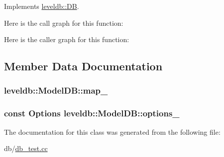 Implements \hyperlink{classleveldb_1_1_d_b_ae0b6ded8c8e0b88ff70190bf7a0c086c}{leveldb\-::\-D\-B}.



Here is the call graph for this function\-:




Here is the caller graph for this function\-:




\subsection{Member Data Documentation}
\hypertarget{classleveldb_1_1_model_d_b_ada58b7989a2d120b45f5fed2e4391c65}{
\subsubsection[{map\-\_\-}]{ leveldb\-::\-Model\-D\-B\-::map\-\_\-\hspace{0.3cm}{\ttfamily [private]}}}\label{classleveldb_1_1_model_d_b_ada58b7989a2d120b45f5fed2e4391c65}
\hypertarget{classleveldb_1_1_model_d_b_ae5aee6801bcd1c2d8843607abb2e723a}{
\subsubsection[{options\-\_\-}]{\setlength{\rightskip}{0pt plus 5cm}const {\bf Options} leveldb\-::\-Model\-D\-B\-::options\-\_\-\hspace{0.3cm}{\ttfamily [private]}}}\label{classleveldb_1_1_model_d_b_ae5aee6801bcd1c2d8843607abb2e723a}


The documentation for this class was generated from the following file\-:\begin{DoxyCompactItemize}
\item 
db/\hyperlink{db__test_8cc}{db\-\_\-test.\-cc}\end{DoxyCompactItemize}

